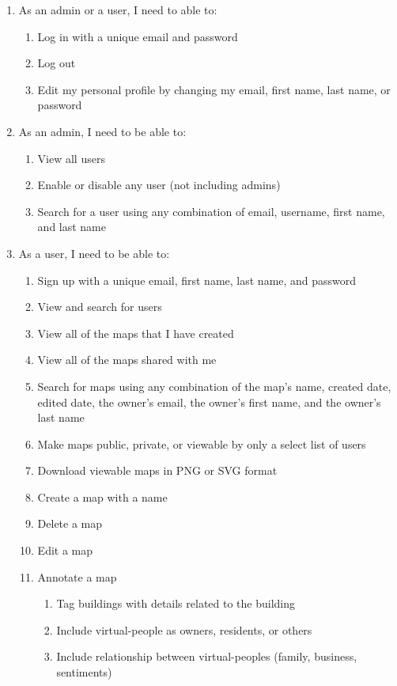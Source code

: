 \begin{enumerate}
  \item As an admin or a user, I need to able to:
  \begin{enumerate}
    \item Log in with a unique email and password
    \item Log out
    \item Edit my personal profile by changing my email, first name, last name, or password
  \end{enumerate}
  \item As an admin, I need to be able to:
  \begin{enumerate}
    \item View all users
    \item Enable or disable any user (not including admins)
    \item Search for a user using any combination of email, username, first name, and last name
  \end{enumerate}
  \item As a user, I need to be able to:
  \begin{enumerate}
    \item Sign up with a unique email, first name, last name, and password
    \item View and search for users
    \item View all of the maps that I have created
    \item View all of the maps shared with me
    \item Search for maps using any combination of the map's name, created date, edited date, the owner's email, the owner's first name, and the owner's last name
    \item Make maps public, private, or viewable by only a select list of users
    \item Download viewable maps in PNG or SVG format
    \item Create a map with a name
    \item Delete a map
    \item Edit a map
    \item Annotate a map
    \begin{enumerate}
      \item Tag buildings with details related to the building
      \item Include virtual-people as owners, residents, or others
      \item Include relationship between virtual-peoples (family, business, sentiments)
    \end{enumerate}
  \end{enumerate}
\end{enumerate}

